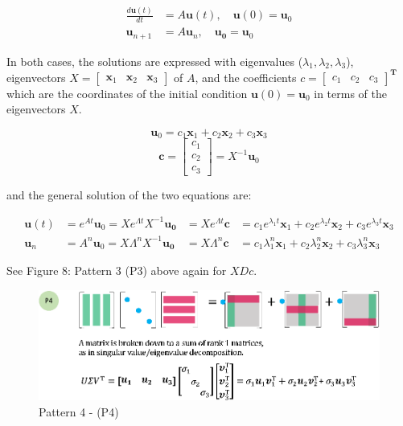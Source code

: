 \documentclass[letterpaper]{article}
\begin{document}
\begin{align*}
  \frac{d \bm{u}(t) }{dt} &= A \bm{u}(t), \quad \bm{u}(0)=\bm{u}_0\\
  \bm{u}_{n+1} &= A \bm{u}_n, \quad \bm{u_0} = \bm{u}_0
\end{align*}

In both cases, the solutions are expressed with
eigenvalues ($\lambda_1, \lambda_2, \lambda_3$), 
eigenvectors $X=\begin{bmatrix} \bm{x}_1 & \bm{x}_2 & \bm{x}_3 \end{bmatrix}$ of $A$, and
the coefficients $c=\begin{bmatrix} c_1 & c_2 & c_3 \end{bmatrix}^\mathbf{T}$
which are the coordinates of the initial condition $\bm{u}(0)=\bm{u}_0$ in terms of
the eigenvectors $X$.

\begin{equation*}
  \bm{u}_0 = c_1 \bm{x}_1 + c_2 \bm{x}_2 + c_3 \bm{x}_3
\end{equation*}
\begin{equation*}
  \bm{c} =
  \begin{bmatrix}
    c_1\\
    c_2\\
    c_3
  \end{bmatrix} = X^{-1} \bm{u}_0
\end{equation*}

and the general solution of the two equations are:

\begin{align*}
  \bm{u}(t) &= e^{At} \bm{u}_0 = X e^{\Lambda t} X^{-1} \bm{u_0} &= X e^{\Lambda t} \bm{c} &= c_1 e^{\lambda_1 t} \bm{x}_1 + c_2 e^{\lambda_2 t} \bm{x}_2 + c_3 e^{\lambda_3 t} \bm{x}_3\\
  \bm{u}_n &= A^n \bm{u}_0 = X \Lambda^n X^{-1} \bm{u_0} &= X \Lambda^n \bm{c} &= c_1 \lambda_1^n \bm{x}_1 + c_2 \lambda_2^n \bm{x}_2 + c_3 \lambda_3^n \bm{x}_3
\end{align*}

See Figure 8: Pattern 3 (P3) above again for $XDc$.

\begin{figure}[H]
  \includegraphics[keepaspectratio, width=\linewidth]{Pattern4.eps}
  \caption{Pattern 4 - (P4)}
\end{figure}
\end{document}
